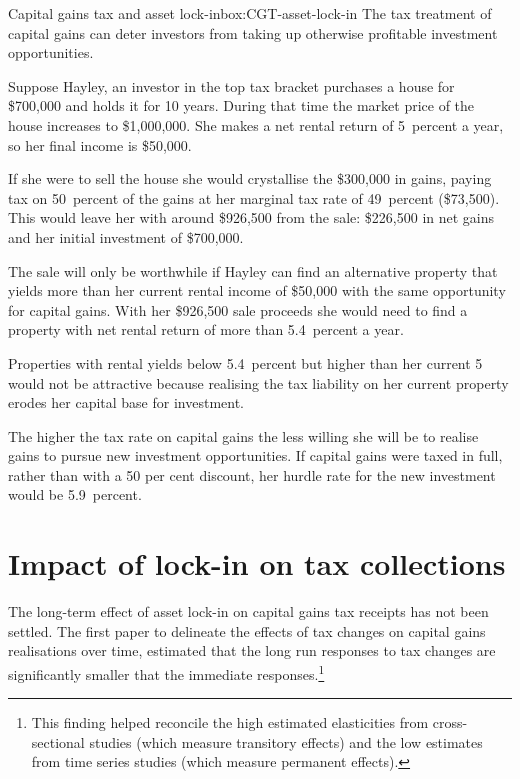 \documentclass{grattanAlpha}\usepackage[]{graphicx}\usepackage[]{color}
\begin{document}
\begin{smallbox}[!hp]{Capital gains tax and asset lock-in}{box:CGT-asset-lock-in}
The tax treatment of capital gains can deter investors from taking up otherwise profitable investment opportunities. 



Suppose Hayley, an investor in the top tax bracket purchases a house for \$700,000 and holds it for 10 years. During that time the market price of the house increases to \$1,000,000. She makes a net rental return of 5~percent a year, so her  final income is \$50,000. 

If she were to sell the house she would crystallise the \$300,000 in gains, paying tax on 50~percent of the gains at her marginal tax rate of 49~percent (\$73,500). This would leave her with around \$926,500 from the sale: \$226,500 in net gains and her initial investment of \$700,000. 

The sale will only be worthwhile if Hayley can find an alternative property that yields more than her current rental income of \$50,000  with the same opportunity for capital gains. With her \$926,500 sale proceeds she would need to find a property with net rental return of more than 5.4~percent a year. 

Properties with rental yields below 5.4~percent but higher than her current 5 would not be attractive because realising the tax liability on her current property erodes her capital base for investment.  

The higher the tax rate on capital gains the less willing she will be to realise gains to pursue new investment opportunities. If capital gains were taxed in full, rather than with a 50 per cent discount, her hurdle rate for the new investment would be 5.9~percent.
\end{smallbox}
\clearpage

\section{Impact of lock-in on tax collections}

The long-term effect of asset lock-in on capital gains tax receipts has not been settled. The first paper to delineate the effects of tax changes on capital gains realisations over time, estimated that the long run responses to tax changes are significantly smaller that the immediate responses.\footnote{\textcite{BurmanRandolph1994} This finding helped reconcile the high estimated elasticities from cross-sectional studies (which measure transitory effects) and the low estimates from time series studies (which measure permanent effects).} 
\end{document}
